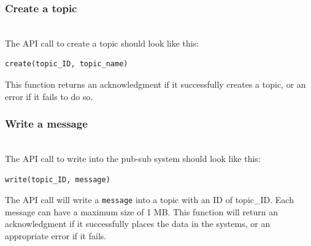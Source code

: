 \subsubsection{Create a topic}\label{YgfxpWLqYVQkRvfhKhOAM}
\\
The API call to create a topic should look like this:

\begin{verbatim}
create(topic_ID, topic_name)
\end{verbatim}

This function returns an acknowledgment if it successfully creates a topic, or an error if it fails to do so.

\begin{table}[htbp]
\centering
\small
{}
\end{table}

\subsubsection{Write a message}\label{iD1_czKzO7mi6mXs-OOkZ}
\\
The API call to write into the pub-sub system should look like this:

\begin{verbatim}
write(topic_ID, message)
\end{verbatim}

The API call will write a \texttt{message} into a topic with an ID of topic\_ID. Each message can have a maximum size of 1 MB. This function will return an acknowledgment if it successfully places the data in the systems, or an appropriate error if it fails.

\begin{table}[htbp]
\centering
\small
{}
\end{table}

